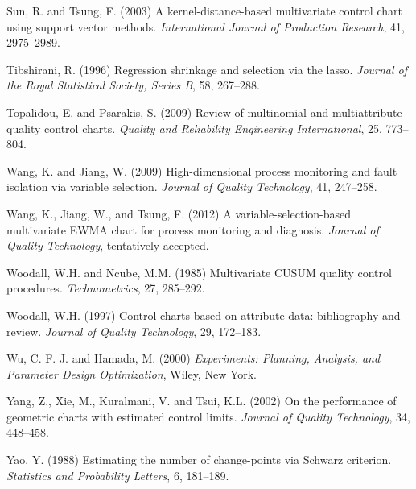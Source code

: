 \begin{thebibliography}{}
\item Sun, R. and Tsung, F. (2003) A kernel-distance-based multivariate control chart
using support vector methods. {\it International Journal of Production Research},
41, 2975--2989.

\item Tibshirani, R. (1996) Regression shrinkage and selection via the lasso. {\it
Journal of the Royal Statistical Society, Series B}, 58, 267--288.

\item Topalidou, E. and Psarakis, S. (2009) Review of multinomial and
multiattribute quality control charts. {\it Quality and Reliability Engineering
International}, 25, 773--804.

\item Wang, K. and Jiang, W. (2009) High-dimensional process monitoring and fault
isolation via variable selection. {\it Journal of Quality Technology}, 41, 247--258.

\item Wang, K., Jiang, W., and Tsung, F. (2012) A variable-selection-based multivariate
EWMA chart for process monitoring and diagnosis. {\it Journal of Quality
Technology}, tentatively accepted.

\item Woodall, W.H. and Ncube, M.M. (1985) Multivariate CUSUM quality control
procedures. {\it Technometrics}, 27, 285--292.

\item Woodall, W.H. (1997) Control charts based on attribute data: bibliography and
review. {\it Journal of Quality Technology}, 29, 172--183.

\item Wu, C. F. J. and Hamada, M. (2000) {\it Experiments: Planning, Analysis, and
Parameter Design Optimization}, Wiley, New York.

\item Yang, Z., Xie, M., Kuralmani, V. and Tsui, K.L. (2002) On the performance
of geometric charts with estimated control limits. {\it Journal of Quality
Technology}, 34, 448--458.

\item Yao, Y. (1988) Estimating the number of change-points via Schwarz criterion.
{\it Statistics and Probability Letters}, 6, 181--189.



\end{thebibliography}
